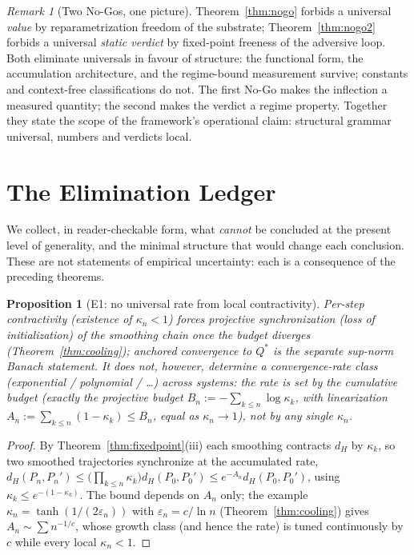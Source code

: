 \documentclass[11pt]{article}
\theoremstyle{plain}
\newtheorem{proposition}[theorem]{Proposition}
\theoremstyle{definition}
\theoremstyle{remark}
\newtheorem{remark}[theorem]{Remark}
\begin{document}
\begin{remark}[Two No-Gos, one picture]\label{rem:twonogos}
Theorem~\ref{thm:nogo} forbids a universal \emph{value} by reparametrization freedom of the substrate; Theorem~\ref{thm:nogo2} forbids a universal \emph{static verdict} by fixed-point freeness of the adversive loop. Both eliminate universals in favour of structure: the functional form, the accumulation architecture, and the regime-bound measurement survive; constants and context-free classifications do not. The first No-Go makes the inflection a measured quantity; the second makes the verdict a regime property. Together they state the scope of the framework's operational claim: structural grammar universal, numbers and verdicts local.
\end{remark}

\section{The Elimination Ledger}\label{sec:ledger}

We collect, in reader-checkable form, what \emph{cannot} be concluded at the present level of generality, and the minimal structure that would change each conclusion. These are not statements of empirical uncertainty: each is a consequence of the preceding theorems.

\begin{proposition}[E1: no universal rate from local contractivity]\label{E1}
Per-step contractivity (existence of $\kappa_n<1$) forces projective synchronization (loss of initialization) of the smoothing chain once the budget diverges (Theorem~\ref{thm:cooling}); anchored convergence to $Q^*$ is the separate sup-norm Banach statement. It does not, however, determine a convergence-rate class (exponential / polynomial / \dots) across systems: the rate is set by the cumulative budget (exactly the projective budget $B_n:=-\sum_{k\le n}\log\kappa_k$, with linearization $A_n:=\sum_{k\le n}(1-\kappa_k)\le B_n$, equal as $\kappa_n\to1$), not by any single $\kappa_n$.
\end{proposition}
\begin{proof}
By Theorem~\ref{thm:fixedpoint}(iii) each smoothing contracts $d_H$ by $\kappa_k$, so two smoothed trajectories synchronize at the accumulated rate, $d_H(P_n,P_n')\le\big(\prod_{k\le n}\kappa_k\big)d_H(P_0,P_0')\le e^{-A_n}d_H(P_0,P_0')$, using $\kappa_k\le e^{-(1-\kappa_k)}$. The bound depends on $A_n$ only; the example $\kappa_n=\tanh(1/(2\varepsilon_n))$ with $\varepsilon_n=c/\ln n$ (Theorem~\ref{thm:cooling}) gives $A_n\sim\sum n^{-1/c}$, whose growth class (and hence the rate) is tuned continuously by $c$ while every local $\kappa_n<1$.
\end{proof}
\end{document}
